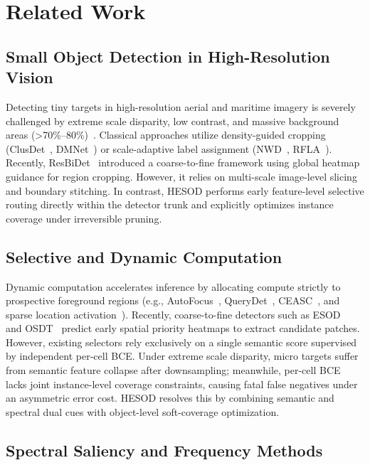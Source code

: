 \section{Related Work}
\label{sec:related}

\subsection{Small Object Detection in High-Resolution Vision}
\label{ssec:related_sod}

Detecting tiny targets in high-resolution aerial and maritime imagery is severely challenged by extreme scale disparity, low contrast, and massive background areas (\textgreater70\%--80\%)~\cite{VisDrone,UAVDT,TinyPerson,SeaDronesSee}. Classical approaches utilize density-guided cropping (ClusDet~\cite{ClusDet}, DMNet~\cite{DMNet}) or scale-adaptive label assignment (NWD~\cite{NWD}, RFLA~\cite{RFLA}). Recently, ResBiDet~\cite{ResBiDet} introduced a coarse-to-fine framework using global heatmap guidance for region cropping. However, it relies on multi-scale image-level slicing and boundary stitching. In contrast, HESOD performs early feature-level selective routing directly within the detector trunk and explicitly optimizes instance coverage under irreversible pruning.

\subsection{Selective and Dynamic Computation}
\label{ssec:related_selective}

Dynamic computation accelerates inference by allocating compute strictly to prospective foreground regions (e.g., AutoFocus~\cite{AutoFocus}, QueryDet~\cite{QueryDet}, CEASC~\cite{CEASC}, and sparse location activation~\cite{Li2025Sparse}). Recently, coarse-to-fine detectors such as ESOD~\cite{ESOD} and OSDT~\cite{Wang2026OSDT} predict early spatial priority heatmaps to extract candidate patches. However, existing selectors rely exclusively on a single semantic score supervised by independent per-cell BCE. Under extreme scale disparity, micro targets suffer from semantic feature collapse after downsampling; meanwhile, per-cell BCE lacks joint instance-level coverage constraints, causing fatal false negatives under an asymmetric error cost. HESOD resolves this by combining semantic and spectral dual cues with object-level soft-coverage optimization.

\subsection{Spectral Saliency and Frequency Methods}
\label{ssec:related_spectral}

